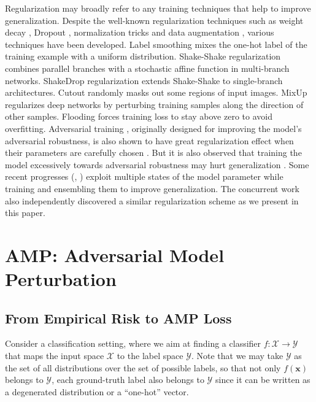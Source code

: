 \documentclass[final]{cvpr}
\begin{document}
Regularization may broadly refer to any training techniques that help to improve generalization. Despite the well-known regularization techniques such as weight decay \cite{krogh1992simple}, Dropout \cite{srivastava2014dropout}, normalization tricks \cite{ba2016layer,ioffe2015batch} and data augmentation \cite{cubuk2019autoaugment,krizhevsky2012imagenet,lim2019fast}, various techniques have been developed. Label smoothing \cite{szegedy2016rethinking} mixes the one-hot label of the training example with a uniform distribution. Shake-Shake regularization \cite{gastaldi2017shake} combines parallel branches with a stochastic affine function in multi-branch networks. ShakeDrop regularization \cite{yamada2019shakedrop} extends Shake-Shake to single-branch architectures. Cutout \cite{devries2017improved} randomly masks out some regions of input images. MixUp \cite{zhang2018mixup} regularizes deep networks by perturbing training samples along the direction of other samples. Flooding \cite{ishida2020we} forces training loss to stay above zero to avoid overfitting. Adversarial training \cite{goodfellow2015explaining}, originally designed for improving the model's adversarial robustness, is also shown to have great regularization effect when their parameters are carefully chosen \cite{miyato2016adversarial}. But it is also observed that training the model excessively towards adversarial robustness may hurt generalization \cite{tsipras2018robustness}. Some recent progresses (\eg, \cite{garipov2018ensembling,izmailov2018averaging}) exploit multiple states of the model parameter while training and ensembling them to improve generalization. The concurrent work \cite{foret2021sharpness} also independently discovered a similar regularization scheme as we present in this paper. 

\section{AMP: Adversarial Model Perturbation}

\subsection{From Empirical Risk to AMP Loss}

Consider a classification setting, where we aim at finding a classifier $f:\mathcal{X}\to\mathcal{Y}$ that maps the input space $\mathcal{X}$ to the label space $\mathcal{Y}$. Note that we may take $\mathcal{Y}$ as the set of all distributions over the set of possible labels, so that not only $f(\boldsymbol{x})$ belongs to $\mathcal{Y}$, each ground-truth label also belongs to $\mathcal{Y}$ since it can be written as a degenerated distribution or a ``one-hot'' vector.
\end{document}
